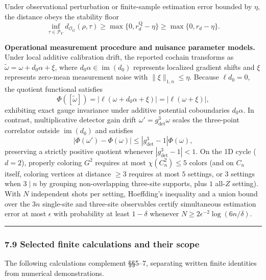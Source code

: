 \documentclass[
  11pt,
]{article}
\begin{document}
Under observational perturbation or finite-sample estimation error bounded by \(\eta\), the distance obeys the stability floor
\[
\inf_{\tau\in\mathcal P_V} d_{\mathcal O_G}(\rho, \tau) \ge \max\{0, r_d^{\mathrm{Q}} - \eta\} \ge \max\{0, r_d - \eta\}.
\]

\textbf{Operational measurement procedure and nuisance parameter models.}
Under local additive calibration drift, the reported cochain transforms as \(\tilde\omega = \omega + d_0\alpha + \xi\), where \(d_0\alpha\in\operatorname{im}(d_0)\) represents localized gradient shifts and \(\xi\) represents zero-mean measurement noise with \(\lVert \xi\rVert_{1,n}\le\eta\). Because \(\ell d_0 = 0\), the quotient functional satisfies
\[
\Phi([\tilde\omega]) = |\ell(\omega + d_0\alpha + \xi)| = |\ell(\omega + \xi)|,
\]
exhibiting exact gauge invariance under additive potential coboundaries \(d_0\alpha\).
In contrast, multiplicative detector gain drift \(\omega' = g_{\mathrm{det}}^3 \omega\) scales the three-point correlator outside \(\operatorname{im}(d_0)\) and satisfies
\[
|\Phi(\omega') - \Phi(\omega)| \le |g_{\mathrm{det}}^3 - 1| \Phi(\omega),
\]
preserving a strictly positive quotient whenever \(|g_{\mathrm{det}}^3 - 1| < 1\).
On the 1D cycle (\(d=2\)), properly coloring \(G^2\) requires at most \(\chi(C_n^2) \le 5\) colors (and on \(C_n\) itself, coloring vertices at distance \(\ge 3\) requires at most \(5\) settings, or \(3\) settings when \(3 \mid n\) by grouping non-overlapping three-site supports, plus \(1\) all-\(Z\) setting). With \(N\) independent shots per setting, Hoeffding's inequality and a union bound over the \(3n\) single-site and three-site observables certify simultaneous estimation error at most \(\epsilon\) with probability at least \(1-\delta\) whenever \(N\ge 2\epsilon^{-2}\log(6n/\delta)\).

\begin{center}\rule{0.5\linewidth}{0.5pt}\end{center}

\subsubsection{7.9 Selected finite calculations and their scope}\label{selected-finite-calculations-and-their-scope}

The following calculations complement §§5--7, separating written finite identities from numerical demonstrations.
\end{document}
